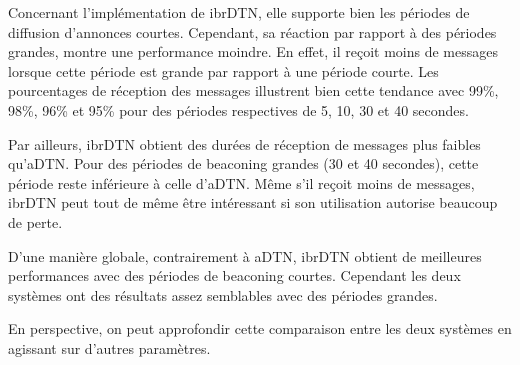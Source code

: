 \documentclass[a4paper,10pt]{article}
\begin{document}
Concernant l’implémentation de ibrDTN, elle supporte bien les périodes de diffusion d'annonces courtes. Cependant, sa réaction par rapport à des périodes grandes, montre une performance moindre. En effet, il reçoit moins de messages lorsque cette période est grande par rapport à une période courte. Les pourcentages de réception des messages illustrent bien cette tendance avec 99\%, 98\%, 96\% et 95\% pour des périodes respectives de 5, 10, 30 et 40 secondes. \par
Par ailleurs, ibrDTN obtient des durées de réception de messages plus faibles qu'aDTN. Pour des périodes de beaconing grandes (30 et 40 secondes), cette période reste inférieure à celle d'aDTN. Même s'il reçoit moins de messages, ibrDTN peut tout de même être intéressant si son utilisation autorise beaucoup de perte. \par

D'une manière globale, contrairement à aDTN,  ibrDTN obtient de meilleures performances avec des périodes de beaconing courtes. Cependant les deux systèmes ont des résultats assez semblables avec des périodes grandes. 

En perspective, on peut approfondir cette comparaison entre les deux systèmes en agissant sur d'autres paramètres.


\newpage



\end{document}
